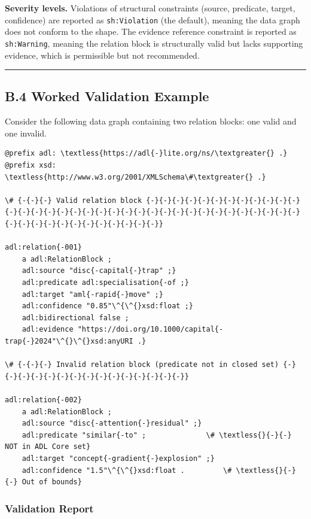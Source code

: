 \textbf{Severity levels.} Violations of structural constraints (source, predicate, target, confidence) are reported as \texttt{sh:Violation} (the default), meaning the data graph does not conform to the shape. The evidence reference constraint is reported as \texttt{sh:Warning}, meaning the relation block is structurally valid but lacks supporting evidence, which is permissible but not recommended.

\begin{center}\rule{0.5\linewidth}{0.5pt}\end{center}


\subsection{B.4 Worked Validation Example}\label{b.4-worked-validation-example}

Consider the following data graph containing two relation blocks: one valid and one invalid.

\begin{lstlisting}
@prefix adl: \textless{https://adl{-}lite.org/ns/\textgreater{} .}
@prefix xsd: \textless{http://www.w3.org/2001/XMLSchema\#\textgreater{} .}

\# {-{-}{-} Valid relation block {-}{-}{-}{-}{-}{-}{-}{-}{-}{-}{-}{-}{-}{-}{-}{-}{-}{-}{-}{-}{-}{-}{-}{-}{-}{-}{-}{-}{-}{-}{-}{-}{-}{-}{-}{-}{-}{-}{-}{-}{-}{-}{-}{-}{-}{-}{-}}

adl:relation{-001}
    a adl:RelationBlock ;
    adl:source "disc{-capital{-}trap" ;}
    adl:predicate adl:specialisation{-of ;}
    adl:target "aml{-rapid{-}move" ;}
    adl:confidence "0.85"\^{\^{}xsd:float ;}
    adl:bidirectional false ;
    adl:evidence "https://doi.org/10.1000/capital{-trap{-}2024"\^{}\^{}xsd:anyURI .}

\# {-{-}{-} Invalid relation block (predicate not in closed set) {-}{-}{-}{-}{-}{-}{-}{-}{-}{-}{-}{-}{-}{-}{-}}

adl:relation{-002}
    a adl:RelationBlock ;
    adl:source "disc{-attention{-}residual" ;}
    adl:predicate "similar{-to" ;              \# \textless{}{-}{-} NOT in ADL Core set}
    adl:target "concept{-gradient{-}explosion" ;}
    adl:confidence "1.5"\^{\^{}xsd:float .         \# \textless{}{-}{-} Out of bounds}
\end{lstlisting}

\subsubsection{Validation Report}\label{b.4.1-validation-report}

